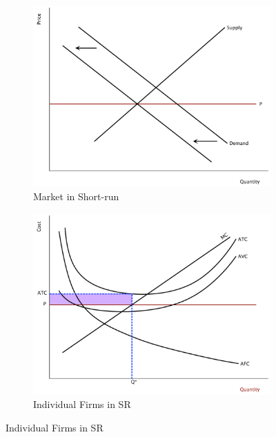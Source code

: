 \documentclass[11pt]{article}\usepackage[]{graphicx}\usepackage[]{color}
\theoremstyle{definition}
\begin{document}
\begin{figure}[ht]
	\begin{subfigure}[b]{0.5\textwidth}
		\centering
		\includegraphics[scale=.30]{plot70.pdf}
		\caption{Market in Short-run}
	\end{subfigure}
	\begin{subfigure}[b]{0.5\textwidth}
		\centering
		\includegraphics[scale=.30]{plot71.pdf}
		\caption{Individual Firms in SR}
	\end{subfigure}
	

\end{figure}
\end{document}

